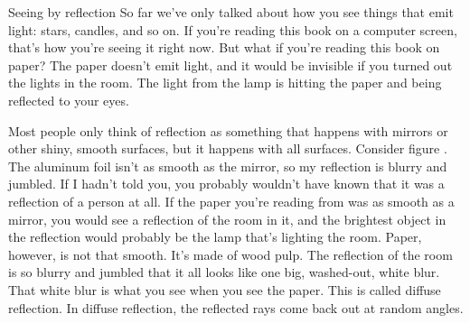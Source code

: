 \begin{envsubsection}{Seeing by reflection}
So far we've only talked about how you see things that emit light: stars, candles,
and so on. If you're reading this book on a computer screen, that's how you're seeing
it right now. But what if you're reading this book on paper? 
The paper doesn't emit light, and it would be invisible if
you turned out the lights in the room. The light from
the lamp is hitting the paper and being reflected to your eyes.

Most people only
think of reflection as something that happens with mirrors or other shiny, smooth
surfaces, but it happens with all surfaces. Consider figure .
The aluminum foil isn't as smooth as the mirror, so my reflection is blurry and jumbled.
If I hadn't told you, you probably wouldn't have known that it was a reflection of a
person at all. If the paper you're reading from was as smooth as a mirror, you would
see a reflection of the room in it, and the brightest object in the reflection would
probably be the lamp that's lighting the room. Paper, however, is not that smooth. It's
made of wood pulp. The reflection of the room is so blurry and jumbled that it all looks
like one big, washed-out, white blur. That white blur is what you see when you see the
paper. This is called diffuse reflection. In diffuse reflection, the reflected rays come
back out at random angles.
\end{envsubsection}
%
